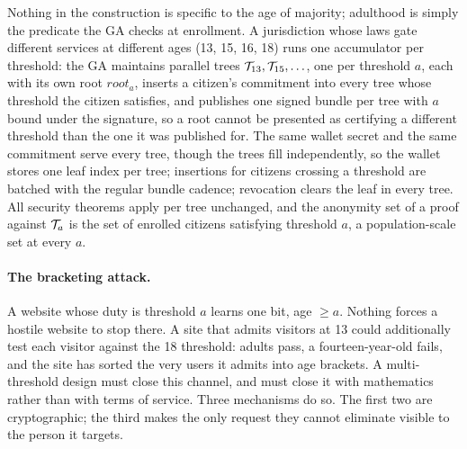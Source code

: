\documentclass[11pt]{article}
\theoremstyle{definition}
\begin{document}
Nothing in the construction is specific to the age of majority; adulthood is simply the
predicate the GA checks at enrollment. A jurisdiction whose laws gate different services
at different ages (13, 15, 16, 18) runs one accumulator per threshold: the GA maintains
parallel trees $\mathcal{T}_{13}, \mathcal{T}_{15}, \ldots$, one per threshold $a$, each with its own root
$\mathit{root}_a$, inserts a citizen's commitment into every tree whose threshold the
citizen satisfies, and publishes one signed bundle per tree with $a$ bound under the
signature, so a root cannot be presented as certifying a different threshold than the one
it was published for. The same wallet secret and the same commitment serve every tree,
though the trees fill independently, so the wallet stores one leaf index per tree;
insertions for citizens crossing a threshold are batched with the regular bundle cadence;
revocation clears the leaf in every tree. All security theorems apply per tree unchanged,
and the anonymity set of a proof against $\mathcal{T}_a$ is the set of enrolled citizens satisfying
threshold $a$, a population-scale set at every $a$.

\paragraph{The bracketing attack.} A website whose duty is threshold $a$ learns one bit,
age $\ge a$. Nothing forces a hostile website to stop there. A site that admits visitors
at 13 could additionally test each visitor against the 18 threshold: adults pass, a
fourteen-year-old fails, and the site has sorted the very users it admits into age
brackets. A multi-threshold design must close this channel, and must close it with
mathematics rather than with terms of service. Three mechanisms do so. The first two are
cryptographic; the third makes the only request they cannot eliminate visible to the
person it targets.
\end{document}
